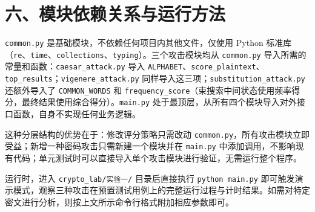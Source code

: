 \documentclass[12pt, a4paper]{article}
\begin{document}
\section{六、模块依赖关系与运行方法}

\texttt{common.py} 是基础模块，不依赖任何项目内其他文件，仅使用 Python 标准库（\texttt{re}、\texttt{time}、\texttt{collections}、\texttt{typing}）。三个攻击模块均从 \texttt{common.py} 导入所需的常量和函数：\texttt{caesar\_attack.py} 导入 \texttt{ALPHABET}、\texttt{score\_plaintext}、\texttt{top\_results}；\texttt{vigenere\_attack.py} 同样导入这三项；\texttt{substitution\_attack.py} 还额外导入了 \texttt{COMMON\_WORDS} 和 \texttt{frequency\_score}（束搜索中间状态使用频率得分，最终结果使用综合得分）。\texttt{main.py} 处于最顶层，从所有四个模块导入对外接口函数，自身不实现任何业务逻辑。

这种分层结构的优势在于：修改评分策略只需改动 \texttt{common.py}，所有攻击模块立即受益；新增一种密码攻击只需新建一个模块并在 \texttt{main.py} 中添加调用，不影响现有代码；单元测试时可以直接导入单个攻击模块进行验证，无需运行整个程序。

运行时，进入 \texttt{crypto\_lab/实验一/} 目录后直接执行 \texttt{python main.py} 即可触发演示模式，观察三种攻击在预置测试用例上的完整运行过程与计时结果。如需对特定密文进行分析，则按上文所示命令行格式附加相应参数即可。
\end{document}
